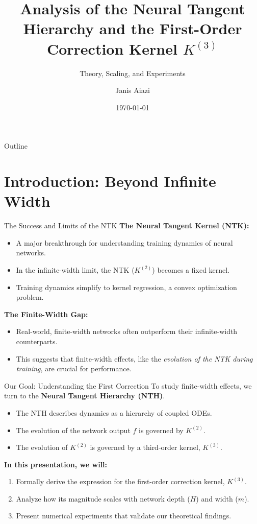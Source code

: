 \documentclass{beamer}
\title{Analysis of the Neural Tangent Hierarchy and the First-Order Correction Kernel $K^{(3)}$}
\subtitle{Theory, Scaling, and Experiments}
\author{Janis Aiazi}
\institute{UMD, Ecole Polytechnique}
\date{\today}
\begin{document}
\begin{frame}
\titlepage
\end{frame}

\begin{frame}{Outline}
\tableofcontents
\end{frame}

\section{Introduction: Beyond Infinite Width}

\begin{frame}{The Success and Limits of the NTK}
\textbf{The Neural Tangent Kernel (NTK):}
\begin{itemize}
    \item A major breakthrough for understanding training dynamics of neural networks.
    \item In the infinite-width limit, the NTK ($K^{(2)}$) becomes a fixed kernel.
    \item Training dynamics simplify to kernel regression, a convex optimization problem.
\end{itemize}
\vspace{1cm}
\textbf{The Finite-Width Gap:}
\begin{itemize}
    \item Real-world, finite-width networks often outperform their infinite-width counterparts.
    \item This suggests that finite-width effects, like the \textit{evolution of the NTK during training}, are crucial for performance.
\end{itemize}
\end{frame}

\begin{frame}{Our Goal: Understanding the First Correction}
To study finite-width effects, we turn to the \textbf{Neural Tangent Hierarchy (NTH)}.
\begin{itemize}
    \item The NTH describes dynamics as a hierarchy of coupled ODEs.
    \item The evolution of the network output $f$ is governed by $K^{(2)}$.
    \item The evolution of $K^{(2)}$ is governed by a third-order kernel, $K^{(3)}$.
\end{itemize}
\vspace{1cm}
\textbf{In this presentation, we will:}
\begin{enumerate}
    \item Formally derive the expression for the first-order correction kernel, $K^{(3)}$.
    \item Analyze how its magnitude scales with network depth ($H$) and width ($m$).
    \item Present numerical experiments that validate our theoretical findings.
\end{enumerate}
\end{frame}
\end{document}
